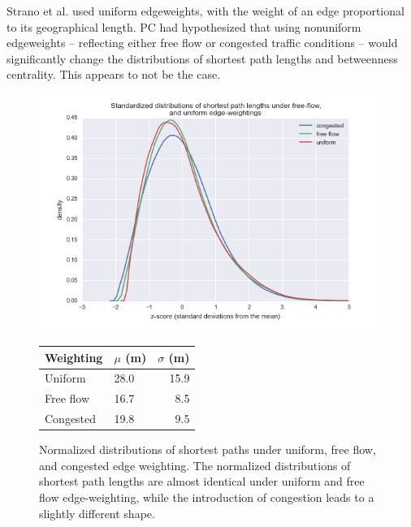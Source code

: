 \documentclass[english]{scrartcl}
\begin{document}
			Strano et al. used uniform edgeweights, with the weight of an edge proportional to its geographical length. PC had hypothesized that using nonuniform edgeweights -- reflecting either free flow or congested traffic conditions -- would significantly change the distributions of shortest path lengths and betweenness centrality. This appears to not be the case.   
			\begin{figure}
				\begin{minipage}{0.65\textwidth}
					\includegraphics[width = 1\textwidth]{shortest_path_distributions_normed.png}
				\end{minipage}
				\begin{minipage}{0.25\textwidth}
						\begin{tabular}{llr}  
							\toprule
							Weighting    & $\mu$ (m) & $\sigma$ (m) \\
							\midrule
							Uniform     &  28.0   &  15.9 \\
							Free flow   &  16.7   &  8.5  \\
							Congested   &  19.8   &  9.5  \\
							\bottomrule
						\end{tabular}		
				\end{minipage}
				\caption{Normalized distributions of shortest paths under uniform, free flow, and congested edge weighting. The normalized distributions of shortest path lengths are almost identical under uniform and free flow edge-weighting, while the introduction of congestion leads to a slightly different shape.}
				\label{fig:1}
			\end{figure}
			
\end{document}
